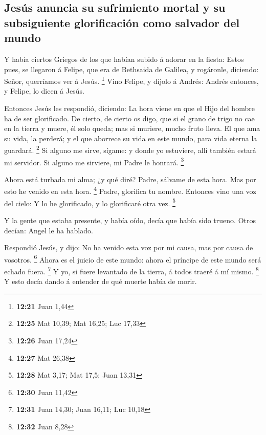 \hypertarget{jesuxfas-anuncia-su-sufrimiento-mortal-y-su-subsiguiente-glorificaciuxf3n-como-salvador-del-mundo}{%
\subsection{Jesús anuncia su sufrimiento mortal y su subsiguiente
glorificación como salvador del
mundo}\label{jesuxfas-anuncia-su-sufrimiento-mortal-y-su-subsiguiente-glorificaciuxf3n-como-salvador-del-mundo}}

 Y había ciertos Griegos de los que habían subido á
adorar en la fiesta:  Estos pues, se llegaron á Felipe,
que era de Bethsaida de Galilea, y rogáronle, diciendo: Señor,
querríamos ver á Jesús. \footnote{\textbf{12:21} Juan 1,44}
 Vino Felipe, y díjolo á Andrés: Andrés entonces, y
Felipe, lo dicen á Jesús.

 Entonces Jesús les respondió, diciendo: La hora viene en
que el Hijo del hombre ha de ser glorificado.  De cierto,
de cierto os digo, que si el grano de trigo no cae en la tierra y muere,
él solo queda; mas si muriere, mucho fruto lleva.  El que
ama su vida, la perderá; y el que aborrece su vida en este mundo, para
vida eterna la guardará. \footnote{\textbf{12:25} Mat 10,39; Mat 16,25;
  Luc 17,33}  Si alguno me sirve, sígame: y donde yo
estuviere, allí también estará mi servidor. Si alguno me sirviere, mi
Padre le honrará. \footnote{\textbf{12:26} Juan 17,24}

 Ahora está turbada mi alma; ¿y qué diré? Padre, sálvame
de esta hora. Mas por esto he venido en esta hora. \footnote{\textbf{12:27}
  Mat 26,38}  Padre, glorifica tu nombre. Entonces vino
una voz del cielo: Y lo he glorificado, y lo glorificaré otra vez.
\footnote{\textbf{12:28} Mat 3,17; Mat 17,5; Juan 13,31}

 Y la gente que estaba presente, y había oído, decía que
había sido trueno. Otros decían: Angel le ha hablado.

 Respondió Jesús, y dijo: No ha venido esta voz por mi
causa, mas por causa de vosotros. \footnote{\textbf{12:30} Juan 11,42}
 Ahora es el juicio de este mundo: ahora el príncipe de
este mundo será echado fuera. \footnote{\textbf{12:31} Juan 14,30; Juan
  16,11; Luc 10,18}  Y yo, si fuere levantado de la
tierra, á todos traeré á mí mismo. \footnote{\textbf{12:32} Juan 8,28}
 Y esto decía dando á entender de qué muerte había de
morir.

